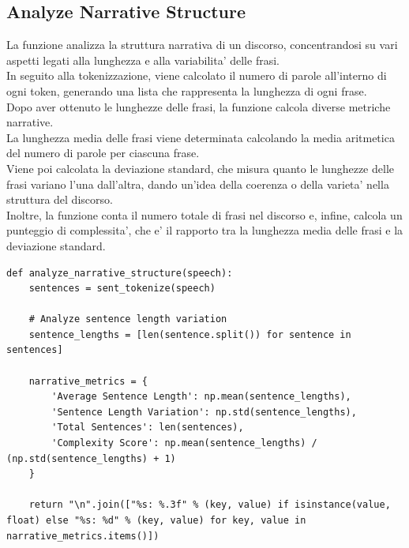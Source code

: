 \documentclass{article}
\begin{document}
		\subsection{Analyze Narrative Structure}
La funzione analizza la struttura narrativa di un discorso, concentrandosi su vari aspetti legati alla lunghezza e alla variabilita' delle frasi. \\In seguito alla tokenizzazione, viene calcolato il numero di parole all'interno di ogni token, generando una lista che rappresenta la lunghezza di ogni frase.\\
Dopo aver ottenuto le lunghezze delle frasi, la funzione calcola diverse metriche narrative. \\La lunghezza media delle frasi viene determinata calcolando la media aritmetica del numero di parole per ciascuna frase.\\ Viene poi calcolata la deviazione standard, che misura quanto le lunghezze delle frasi variano l'una dall'altra, dando un'idea della coerenza o della varieta' nella struttura del discorso. \\Inoltre, la funzione conta il numero totale di frasi nel discorso e, infine, calcola un punteggio di complessita', che e' il rapporto tra la lunghezza media delle frasi e la deviazione standard.		
	\begin{lstlisting}
def analyze_narrative_structure(speech):
	sentences = sent_tokenize(speech)
	
	# Analyze sentence length variation
	sentence_lengths = [len(sentence.split()) for sentence in sentences]
	
	narrative_metrics = {
		'Average Sentence Length': np.mean(sentence_lengths),
		'Sentence Length Variation': np.std(sentence_lengths),
		'Total Sentences': len(sentences),
		'Complexity Score': np.mean(sentence_lengths) / (np.std(sentence_lengths) + 1)
	}

	return "\n".join(["%s: %.3f" % (key, value) if isinstance(value, float) else "%s: %d" % (key, value) for key, value in narrative_metrics.items()])

	\end{lstlisting}
		
\end{document}
